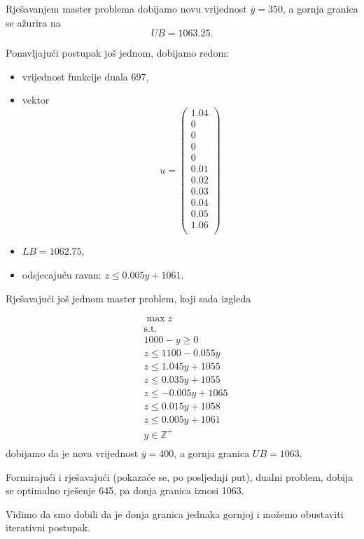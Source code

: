 \documentclass[a4paper, utf8, 11pt, colorlinks]{book}
\theoremstyle{definition}
\begin{document}
 Rješavanjem master problema dobijamo novu vrijednost $\overline{y} =350$, a gornja granica se ažurira na 
 $$UB = 1063.25.$$
 
 Ponavljajući postupak još jednom, dobijamo redom: 
 \begin{itemize}
 	\item 
 vrijednost funkcije duala 697,
 \item vektor 
  $$u=\left(\begin{array}{c}
 	1.04\\
 	0\\
 	0\\
 	0\\
 	0\\
 	0.01\\
 	0.02\\
 	0.03\\
 	0.04\\
 	0.05\\
 	1.06\\
 \end{array}\right)$$
\item $LB = 1062.75$,
\item odsjecajuću ravan:  $z\leqslant 0.005y+1061$.
\end{itemize}


Rješavajući još jednom master problem, koji sada izgleda

  $$
\begin{aligned}
	&\max z\\
	&\mbox{s.t.}\\
	&1000-y\geqslant 0\\
	&z\leqslant 1100-0.055y\\ 
	&z\leqslant 1.045y+1055\\
	&z\leqslant 0.035y+1055\\
	&z\leqslant -0.005y+1065\\
	&z\leqslant 0.015y+1058\\
	&z\leqslant 0.005y+1061\\
	&y\in\mathbb{Z}^+\\	
\end{aligned}
$$
dobijamo da je nova vrijednost $\overline{y}=400$, a gornja granica $UB = 1063$.

Formirajući i rješavajući (pokazaće se, po posljednji put), dualni problem, dobija se optimalno rješenje 645, pa donja granica iznosi 1063.

Vidimo da smo dobili da je donja granica jednaka gornjoj i možemo obustaviti iterativni postupak.
\end{document}
